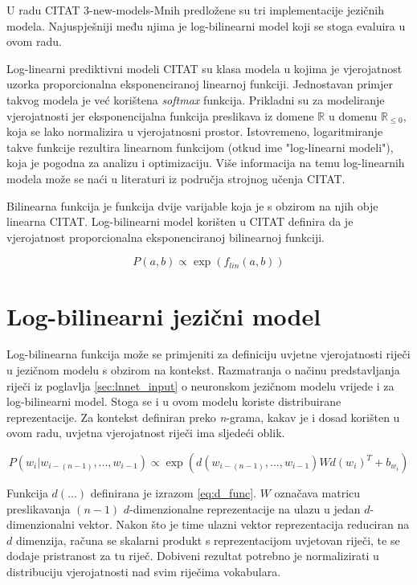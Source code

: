 \documentclass[times, utf8, diplomski, numeric]{fer}
\begin{document}
U radu CITAT 3-new-models-Mnih predložene su tri implementacije jezičnih modela. Najuspješniji među njima je log-bilinearni model koji se stoga evaluira u ovom radu.

Log-linearni prediktivni modeli CITAT su klasa modela u kojima je vjerojatnost uzorka proporcionalna eksponenciranoj linearnoj funkciji. Jednostavan primjer takvog modela je već korištena \textit{softmax} funkcija. Prikladni su za modeliranje vjerojatnosti jer eksponencijalna funkcija preslikava iz domene $\mathbb{R}$ u domenu $\mathbb{R}_{\leq 0}$, koja se lako normalizira u vjerojatnosni prostor. Istovremeno, logaritmiranje takve funkcije rezultira linearnom funkcijom (otkud ime "log-linearni modeli"), koja je pogodna za analizu i optimizaciju. Više informacija na temu log-linearnih modela može se naći u literaturi iz područja strojnog učenja CITAT.

Bilinearna funkcija je funkcija dvije varijable koja je s obzirom na njih obje linearna CITAT. Log-bilinearni model korišten u CITAT definira da je vjerojatnost proporcionalna eksponenciranoj bilinearnoj funkciji.

\[
P(a, b) \propto \exp(f_{lin}(a, b))
\]

\section{Log-bilinearni jezični model}

Log-bilinearna funkcija može se primjeniti za definiciju uvjetne vjerojatnosti riječi u jezičnom modelu s obzirom na kontekst. Razmatranja o načinu predstavljanja riječi iz poglavlja \ref{sec:lnnet_input} o neuronskom jezičnom modelu vrijede i za log-bilinearni model. Stoga se i u ovom modelu koriste distribuirane reprezentacije. Za kontekst definiran preko \textit{n}-grama, kakav je i dosad korišten u ovom radu, uvjetna vjerojatnost riječi ima sljedeći oblik.

\begin{equation}
P(w_i | w_{i - (n - 1)}, ... , w_{i - 1}) 
  \propto \exp(d(w_{i - (n - 1)}, ... , w_{i - 1}) W d(w_i)^T + b_{w_i})
\end{equation}

Funkcija $d(...)$ definirana je izrazom \ref{eq:d_func}. $W$ označava matricu preslikavanja $(n - 1)$ $d$-dimenzionalne reprezentacije na ulazu u jedan $d$-dimenzionalni vektor. Nakon što je time ulazni vektor reprezentacija reduciran na $d$ dimenzija, računa se skalarni produkt s reprezentacijom uvjetovan riječi, te se dodaje pristranost za tu riječ. Dobiveni rezultat potrebno je normalizirati u distribuciju vjerojatnosti nad svim riječima vokabulara.
\end{document}
